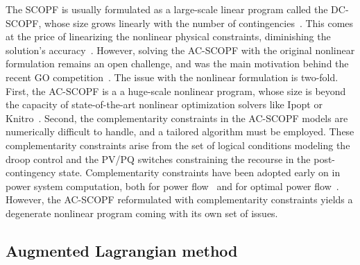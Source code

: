 \documentclass{IEEEtran4PSCC}
\begin{document}
The SCOPF is usually formulated as a large-scale linear program called the DC-SCOPF, whose size
grows linearly with the number of contingencies~\cite{alsac2002further}.
This comes at the price of linearizing the nonlinear physical constraints, diminishing the solution's accuracy~\cite{coffrin2012approximating}.
However, solving the AC-SCOPF with the original nonlinear formulation remains an open challenge,
and was the main motivation behind the recent GO competition~\cite{aravena2023recent}.
The issue with the nonlinear formulation is two-fold. First, the AC-SCOPF is a a huge-scale
nonlinear program, whose size is beyond the capacity of state-of-the-art nonlinear optimization solvers
like Ipopt or Knitro~\cite{wachter2006implementation,waltz2006interior,capitanescu2011state}.
Second, the complementarity constraints in the AC-SCOPF models are numerically
difficult to handle, and a tailored algorithm must be employed.
These complementarity constraints arise from the set of logical conditions
modeling the droop control and the PV/PQ switches constraining the recourse in the post-contingency state.
Complementarity constraints have been adopted early
on in power system computation, both for power flow~\cite{zhao2008pv,sundaresh2014modified,murray2015robust} and for optimal power flow~\cite{rosehart2005optimal}.
However, the AC-SCOPF reformulated with complementarity constraints yields a degenerate nonlinear program
coming with its own set of issues.

\subsection{Augmented Lagrangian method}
\end{document}
